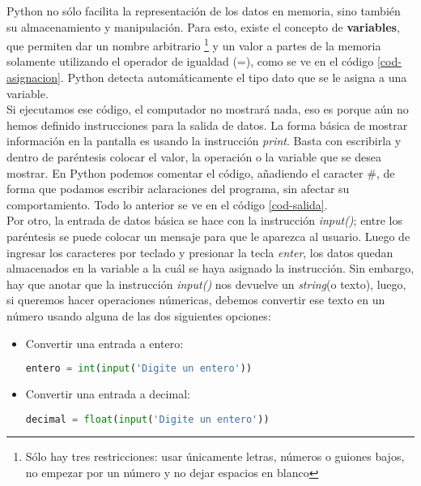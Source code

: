 Python no sólo facilita la representación de los datos en memoria, sino también su almacenamiento y manipulación. Para esto, existe el concepto de \textbf{variables}, que permiten dar un nombre arbitrario \footnote{Sólo hay tres restricciones: usar únicamente letras, números o guiones bajos, no empezar por un número y no dejar espacios en blanco} y un valor a partes de la memoria solamente utilizando el operador de igualdad (=), como se ve en el código \ref{cod-asignacion}. Python detecta automáticamente el tipo dato que se le asigna a una variable. \\



Si ejecutamos ese código, el computador no mostrará nada, eso es porque aún no hemos definido instrucciones para la salida de datos. La forma básica de mostrar información en la pantalla es usando la instrucción \emph{print}. Basta con escribirla y dentro de paréntesis colocar el valor, la operación o la variable que se desea mostrar. En Python podemos comentar el código, añadiendo el caracter \#, de forma que podamos escribir aclaraciones del programa, sin afectar su comportamiento. Todo lo anterior se ve en el código \ref{cod-salida}. \\




Por otro, la entrada de datos básica se hace con la instrucción \emph{input()}; entre los paréntesis se puede colocar un mensaje para que le aparezca al usuario. Luego de ingresar los caracteres por teclado y presionar la tecla \emph{enter}, los datos quedan almacenados en la variable a la cuál se haya asignado la instrucción. Sin embargo, hay que anotar que la instrucción \emph{input()} nos devuelve un \emph{string}(o texto), luego, si queremos hacer operaciones númericas, debemos convertir ese texto en un número usando alguna de las dos siguientes opciones:

\begin{itemize}
 \item Convertir una entrada a entero: 
 \begin{lstlisting}[language=Python]
 entero = int(input('Digite un entero')) \end{lstlisting}
 \item Convertir una entrada a decimal:
 \begin{lstlisting}[language=Python]
 decimal = float(input('Digite un entero')) \end{lstlisting}
\end{itemize}

